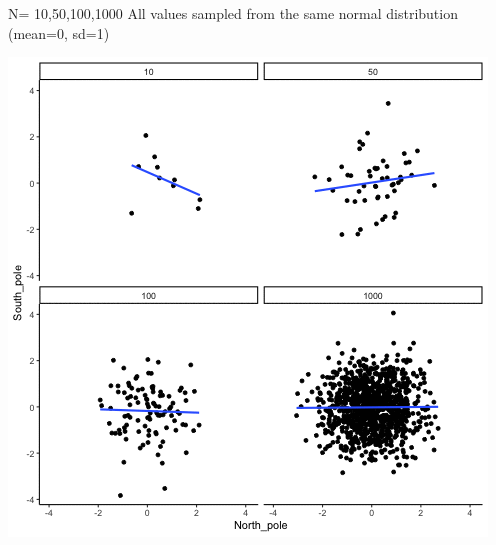 \documentclass[
]{book}
\begin{document}
N= 10,50,100,1000
All values sampled from the same normal distribution (mean=0, sd=1)

\includegraphics{gifs/corNormFourNs-1.gif}
\end{document}
